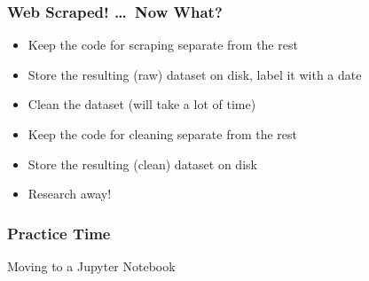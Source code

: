 \documentclass[10pt, aspectratio=1610, natbib, handout]{beamer}
\begin{document}
  \begin{frame}
    \frametitle{Web Scraped! \dots\ Now What?}

    \begin{itemize}
      \item Keep the code for scraping separate from the rest
      \vfill\pause
      \item Store the resulting (raw) dataset on disk, label it with a date
      \vfill\pause
      \item Clean the dataset (will take a lot of time)
      \vfill\pause
      \item Keep the code for cleaning separate from the rest
      \vfill\pause
      \item Store the resulting (clean) dataset on disk
      \vfill\pause
      \item Research away!
    \end{itemize}

  \end{frame}

  \begin{frame}
    \frametitle{Practice Time}

    Moving to a Jupyter Notebook

  \end{frame}
\end{document}
